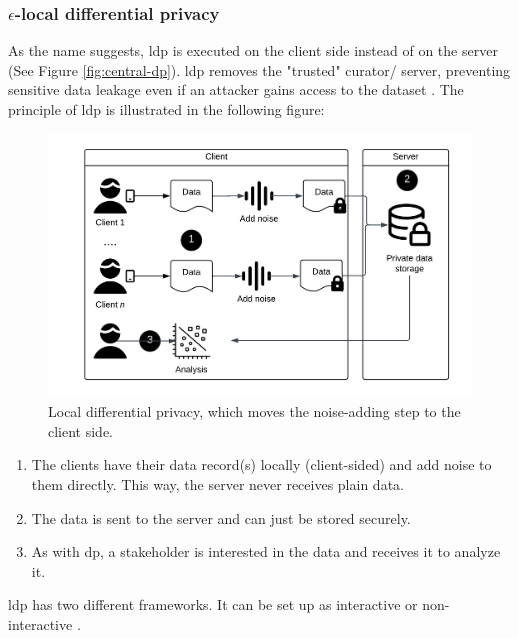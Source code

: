 \subsubsection{$\epsilon$-local differential privacy}
As the name suggests, \gls{ldp} is executed on the client side instead of on the server (See Figure \ref{fig:central-dp}).
\gls{ldp} removes the "trusted" curator/ server, preventing sensitive data leakage even if an attacker gains access to the dataset \citep{del_rey_comprehensive_2020}.
The principle of \gls{ldp} is illustrated in the following figure:
\begin{figure}[H]
  \includegraphics[width=1\textwidth]{TheorethicalFramework/Differential privacy/local-dp.png}
  \caption{Local differential privacy, which moves the noise-adding step to the client side.}
  \label{fig:local-dp}
\end{figure}
\begin{enumerate}
  \item The clients have their data record(s) locally (client-sided) and add noise to them directly. This way, the server never receives plain data.
  \item The data is sent to the server and can just be stored securely.
  \item As with \gls{dp}, a stakeholder is interested in the data and receives it to analyze it.
\end{enumerate}
\gls{ldp} has two different frameworks.
It can be set up as interactive or non-interactive \citep{del_rey_comprehensive_2020}.
\newline
